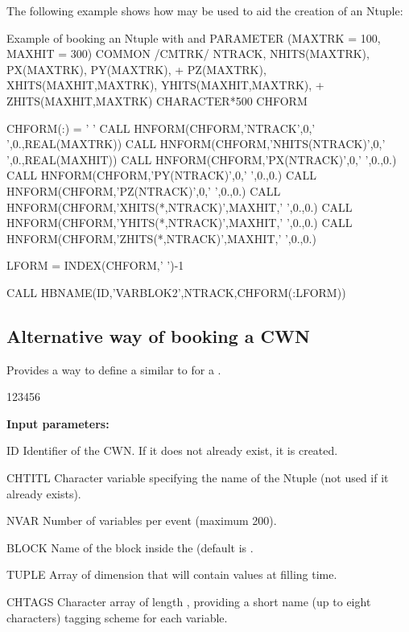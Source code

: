 The following example shows how  may be used to aid the
creation of an Ntuple:

\begin{XMPt}{Example of booking an Ntuple with  and }
      PARAMETER (MAXTRK = 100, MAXHIT = 300)
      COMMON /CMTRK/ NTRACK, NHITS(MAXTRK), PX(MAXTRK), PY(MAXTRK),
     +               PZ(MAXTRK), XHITS(MAXHIT,MAXTRK), YHITS(MAXHIT,MAXTRK),
     +               ZHITS(MAXHIT,MAXTRK)
      CHARACTER*500 CHFORM

      CHFORM(:) = ' '
      CALL HNFORM(CHFORM,'NTRACK',0,' ',0.,REAL(MAXTRK))
      CALL HNFORM(CHFORM,'NHITS(NTRACK)',0,' ',0.,REAL(MAXHIT))
      CALL HNFORM(CHFORM,'PX(NTRACK)',0,' ',0.,0.)
      CALL HNFORM(CHFORM,'PY(NTRACK)',0,' ',0.,0.)
      CALL HNFORM(CHFORM,'PZ(NTRACK)',0,' ',0.,0.)
      CALL HNFORM(CHFORM,'XHITS(*,NTRACK)',MAXHIT,' ',0.,0.)
      CALL HNFORM(CHFORM,'YHITS(*,NTRACK)',MAXHIT,' ',0.,0.)
      CALL HNFORM(CHFORM,'ZHITS(*,NTRACK)',MAXHIT,' ',0.,0.)

      LFORM = INDEX(CHFORM,' ')-1

      CALL HBNAME(ID,'VARBLOK2',NTRACK,CHFORM(:LFORM))

\end{XMPt}





\subsection*{Alternative way of booking a CWN}


\Action Provides a way to define a \CWN{} similar to
 for a \RWN{}.

\begin{DLttc}{123456}
\item[{\rm\bf Input parameters:}]
\item[ID] Identifier of the CWN{}.
          If it does not already exist, it is created.
\item[CHTITL] Character variable specifying the name of the Ntuple
          (not used if it already exists).
\item[NVAR]  Number of variables per event (maximum 200).
\item[BLOCK] Name of the block inside the \CWN (default is .
\item[TUPLE] Array of dimension  that will contain values at filling
                 time.
\item[CHTAGS] Character array of length , providing a short
    name (up to eight characters) tagging scheme for each variable.
\end{DLttc}

